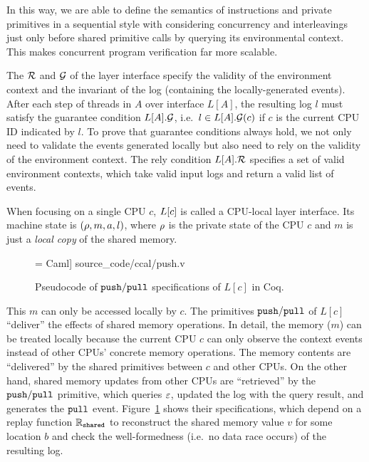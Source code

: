 In this way, we are able to define the semantics of instructions
and private primitives in a sequential style 
with considering concurrency
and interleavings  just only before 
shared primitive calls by querying its environmental context.
This makes concurrent program verification far more scalable.

The $\mathcal{R}$ and $\mathcal{G}$ of the layer interface specify the validity of the environment context and the invariant of the log (containing the locally-generated events).
After each step of threads in $A$ over interface $L[A]$, 
the resulting log $l$  must satisfy the guarantee condition $L[A].\mathcal{G}$, i.e.\, $l \in L[A].\mathcal{G}(c)$ if $c$ is the current CPU ID indicated by $l$. 
To prove that
 guarantee conditions always hold,  we not only need to validate the events generated locally
but also need to rely on the validity of the environment context. The rely condition $L[A].\mathcal{R}$ specifies a set of
valid environment contexts, which take valid input logs
and return a valid list of events.

When focusing on a single CPU $c$, $L[c]$ is called 
a CPU-local layer interface.
Its machine state is $(\rho, m, a, l)$,
where $\rho$ is the private state of the CPU $c$
and $m$ is just a \emph{local copy} of the shared memory.

\begin{figure}[t]
 = Caml] {source_code/ccal/push.v}
\caption{Pseudocode of ${\mathrm{\texttt{push}}}/{\mathrm{\texttt{pull}}}$ specifications of $L[c]$ in Coq.}
\label{fig:exp:pull}
\end{figure}


This $m$ can only be accessed locally by $c$. The primitives ${\mathrm{\texttt{push}}}/{\mathrm{\texttt{pull}}}$ of
$L[c]$  ``deliver'' the effects of shared memory operations.
In detail, the memory ($m$) can be treated locally
because the current CPU $c$ can only observe 
the context events instead of other CPUs'  concrete memory
operations. The memory contents are ``delivered''  by the  shared primitives
between $c$ and other CPUs.
On the other hand, 
shared memory updates from other CPUs are ``retrieved'' by the ${\mathrm{\texttt{push}}}/{\mathrm{\texttt{pull}}}$ primitive, 
which  queries $\oracle$, updated the log
with the query result, and generates the ${\mathrm{\texttt{pull}}}$ event.
Figure~\ref{fig:exp:pull} shows their specifications, which depend on
a replay function  $\mathbb{R}_{{\mathrm{\texttt{shared}}}}$ to
reconstruct the shared memory value $v$ for some location $b$ and check the well-formedness (i.e.\, no data race occurs)
of the resulting log.

